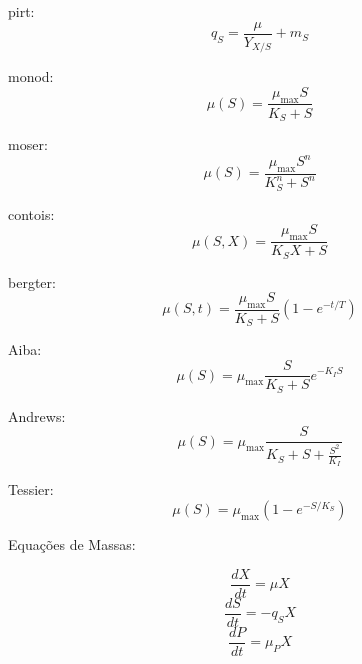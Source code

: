 \documentclass{article}
\begin{document}
pirt:
\[ q_{S} = \frac{\mu}{Y_{X/S}} + m_{S} \]

monod:
\[ \mu(S) = \frac{\mu_{\max} S}{K_{S} + S} \]

moser:
\[ \mu(S) = \frac{\mu_{\max} S^n}{K_{S}^n + S^n} \]

contois:
\[ \mu(S,X) = \frac{\mu_{\max} S}{K_{S} X + S} \]

bergter:
\[ \mu(S,t) = \frac{\mu_{\max} S}{K_{S} + S} \left(1 - e^{-t/T}\right) \]

Aiba:
\[ \mu(S) = \mu_{\max} \frac{S}{K_S + S} e^{-K_I S} \]

Andrews:
\[ \mu(S) = \mu_{\max} \frac{S}{K_S + S + \frac{S^2}{K_I}} \]

Tessier:
\[ \mu(S) = \mu_{\max} \left(1 - e^{-S/K_S}\right) \]

Equações de Massas:

\[ \frac{dX}{dt} = \mu X \]
\[ \frac{dS}{dt} = -q_{S} X \]
\[ \frac{dP}{dt} = \mu_{P} X \]
\end{document}
